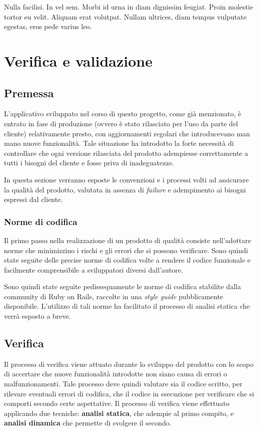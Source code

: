 

\begin{savequote}[75mm]
Nulla facilisi. In vel sem. Morbi id urna in diam dignissim feugiat. Proin molestie tortor eu velit. Aliquam erat volutpat. Nullam ultrices, diam tempus vulputate egestas, eros pede varius leo.
\end{savequote}

\chapter{Verifica e validazione}
\label{chap6}
\section{Premessa}
L'applicativo sviluppato nel corso di questo progetto, come già menzionato, è entrato in fase di produzione (ovvero è stato rilasciato per l'uso da parte del cliente) relativamente presto, con aggiornamenti regolari che introducevano man mano nuove funzionalità. Tale situazione ha introdotto la forte necessità di controllare che ogni versione rilasciata del prodotto adempiesse correttamente a tutti i bisogni del cliente e fosse priva di inadeguatezze.

In questa sezione verranno esposte le convenzioni e i processi volti ad assicurare la qualità del prodotto, valutata in assenza di \textit{failure} e adempimento ai bisogni espressi dal cliente.
\subsection{Norme di codifica}
Il primo passo nella realizzazione di un prodotto di qualità consiste nell'adottare norme che minimizzino i rischi e gli errori che si possono verificare. Sono quindi state seguite delle precise norme di codifica volte a rendere il codice funzionale e facilmente comprensibile a sviluppatori diversi dall'autore.

Sono quindi state seguite pedissequamente le norme di codifica stabilite dalla community di Ruby on Rails, raccolte in una \textit{style guide} pubblicamente disponibile. L'utilizzo di tali norme ha facilitato il processo di analisi statica che verrà esposto a breve.
\section{Verifica}
Il processo di verifica viene attuato durante lo sviluppo del prodotto con lo scopo di accertare che nuove funzionalità introdotte non siano causa di errori o malfunzionamenti. Tale processo deve quindi valutare sia il codice scritto, per rilevare eventuali errori di codifica, che il codice in esecuzione per verificare che si comporti secondo certe aspettative. Il processo di verifica viene effettuato applicando due tecniche: \textbf{analisi statica}, che adempie al primo compito, e \textbf{analisi dinamica} che permette di svolgere il secondo.
